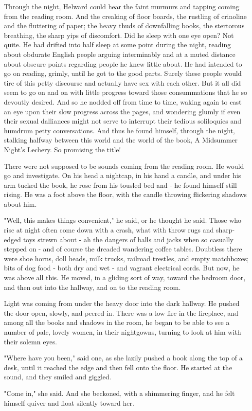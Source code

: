 
Through the night, Helward could hear the faint murmurs and tapping
coming from the reading room. And the creaking of floor boards, the
rustling of crinoline and the fluttering of paper; the heavy thuds of
downfalling books, the stertorous breathing, the sharp yips of
discomfort. Did he sleep with one eye open? Not quite. He had drifted
into half sleep at some point during the night, reading about obdurate
English people arguing interminably and at a muted distance about
obscure points regarding people he knew little about. He had intended to
go on reading, grimly, until he got to the good parts. Surely these
people would tire of this petty discourse and actually have sex with
each other. But it all did seem to go on and on with little progress
toward those consummations that he so devoutly desired. And so he nodded
off from time to time, waking again to cast an eye upon their slow
progress across the pages, and wondering glumly if even their sexual
dalliances might not serve to interrupt their tedious soliloquies and
humdrum petty conversations. And thus he found himself, through the
night, stalking halfway between this world and the world of the book, A
Midsummer Night's Lechery. So promising the title!

There were not supposed to be sounds coming from the reading room. He
would go and investigate. On his head a nightcap, in his hand a candle,
and under his arm tucked the book, he rose from his tousled bed and - he
found himself still rising. He was a foot above the floor, with the
candle throwing flickering shadows about him.

"Well, this makes things convenient," he said, or he thought he said.
Those who rise at night often come down with a crash, what with throw
rugs and sharp-edged toys strewn about - ah the dangers of balls and
jacks when so casually stepped on - and of course the dreaded wandering
coffee tables. Doubtless there were shoe horns, doll heads, milk trucks,
railroad trestles, and empty matchboxes; bits of dog food - both dry and
wet - and vagrant electrical cords. But now, he was above all this. He
moved, in a gliding sort of way, toward the bedroom door, and then out
into the hallway, and on to the reading room.

Light was coming from under the heavy door into the dark hallway. He
pushed the door open, slowly, and peered in. There was a low fire in the
fireplace, and among all the books and shadows in the room, he began to
be able to see a number of pale, lovely women, in their nightgowns,
turning to look at him with their solemn eyes.

"Where have you been," said one, as she lazily pushed a book along the
top of a desk, until it reached the edge and then fell onto the floor.
He started at the sound, and they smiled and giggled.

"Come in," she said. And she beckoned, with a shimmering finger, and he
felt himself quiver and float silently toward her.
